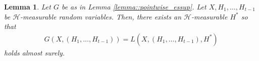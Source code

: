 \documentclass[a4paper]{article}
\newtheorem{lemma}[theorem]{Lemma}
\begin{document}
%

\begin{lemma}\label{optimal_H}
Let $G$ be as in Lemma \ref{lemma::pointwise_essup}. Let $X, H_1,\hdots, H_{t-1}$ be $\mathcal{H}$-measurable random variables. Then, there exists an $\mathcal{H}$-measurable $H^*$ so that
\begin{align*}
G(X,(H_1,\hdots,H_{t-1})) = L(X,(H_1,\hdots, H_{t-1}), H^*)
\end{align*}
holds almost surely.
\end{lemma}
\end{document}
